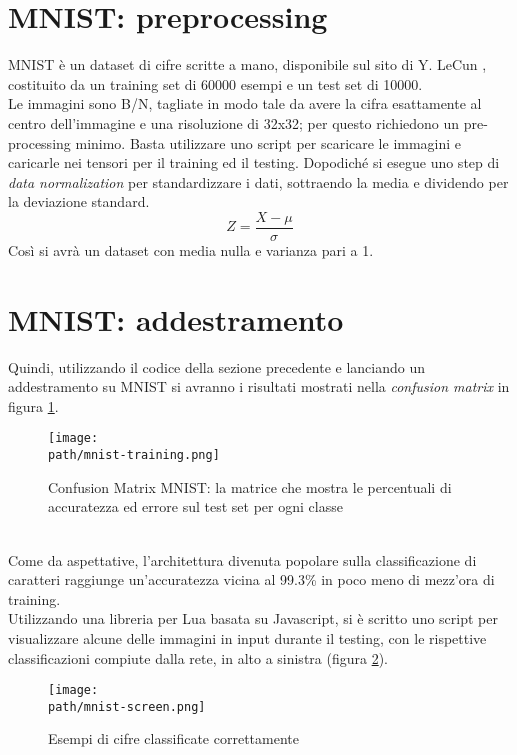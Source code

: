 \section{MNIST: preprocessing}
MNIST è un dataset di cifre scritte a mano, disponibile sul sito di Y. LeCun \parencite{Wlecun}, costituito da un training set di 60000 esempi e un test set di 10000. 
\\
Le immagini sono B/N, tagliate in modo tale da avere la cifra esattamente al centro dell’immagine e una risoluzione di 32x32; per questo richiedono un pre-processing minimo. Basta utilizzare uno script per scaricare le immagini e caricarle nei tensori per il training ed il testing. Dopodiché si esegue uno step di \emph{data normalization} per standardizzare i dati, sottraendo la media e dividendo per la deviazione standard. 
$$
Z = \frac{X-\mu}{\sigma}
$$
Così si avrà un dataset con media nulla e varianza pari a 1. 

\section{MNIST: addestramento}
Quindi, utilizzando il codice della sezione precedente e lanciando un addestramento su MNIST si avranno i risultati mostrati nella \emph{confusion matrix} in figura \ref{fig:mnist-training}. 
\begin{figure}[h!]
 \centering
 \texttt{[image: \\path/mnist-training.png]} 
 \caption{Confusion Matrix MNIST: la matrice che mostra le percentuali di accuratezza ed errore sul test set per ogni classe}
 \label{fig:mnist-training}
\end{figure}
\\
\newline
Come da aspettative, l'architettura divenuta popolare sulla classificazione di caratteri raggiunge un'accuratezza vicina al 99.3\% in poco meno di mezz'ora di training. \\
Utilizzando una libreria per Lua basata su Javascript, si è scritto uno script per visualizzare alcune delle immagini in input durante il testing, con le rispettive classificazioni compiute dalla rete, in alto a sinistra (figura \ref{fig:mnist-correct}).
\begin{figure}[h!]
 \centering
 \texttt{[image: \\path/mnist-screen.png]} 
 \caption{Esempi di cifre classificate correttamente}
 \label{fig:mnist-correct}
\end{figure}

